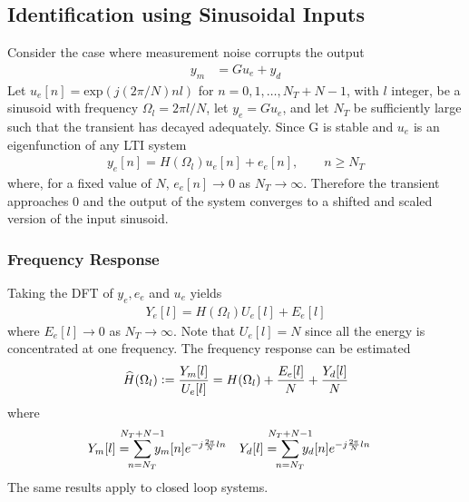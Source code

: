 \subsection{Identification using Sinusoidal Inputs}
Consider the case where measurement noise corrupts the output
\begin{align*}
	y_m &= Gu_e+y_d
\end{align*}
Let $u_e[n] = \textrm{exp}(j (2\pi / N) nl)$ for $n = 0,1,\hdots,N_T+N-1$, with $l$ integer, be a sinusoid with frequency $\Omega_l = 2\pi l/N$, let $y_e = Gu_e$, and let $N_T$ be sufficiently large such that the transient has decayed adequately. Since G is stable and $u_e$ is an eigenfunction of any LTI system
\begin{align*}
	y_e[n] = H(\Omega_l)u_e[n] + e_e[n], \qquad n\geq N_T
\end{align*}
where, for a fixed value of $N$, $e_e[n] \to 0$ as $N_T\to \infty$. Therefore the transient approaches $0$ and the output of the system converges to a shifted and scaled version of the input sinusoid.

\subsubsection{Frequency Response}
Taking the DFT of $y_e, e_e$ and $u_e$ yields
\begin{align*}
	Y_e[l] = H(\Omega_l) U_e[l] + E_e[l]
\end{align*}
where $E_e[l] \to 0$ as $N_T\to \infty$. Note that $U_e[l] = N$ since all the energy is concentrated at one frequency. The frequency response can be estimated
\begin{align*}
	\widehat{H}(\Omega_l) \vcentcolon= \frac{Y_m[l]}{U_e[l]} = H(\Omega_l) + \frac{E_e[l]}{N} + \frac{Y_d[l]}{N}
\end{align*}
where 
\begin{align*}
	Y_m[l] &= \hspace*{-1em}\sum_{n=N_T}^{N_T+N-1}\hspace*{-1em}y_m[n]e^{-j\frac{2\pi}{N}ln} & Y_d[l] &= \hspace*{-1em}\sum_{n=N_T}^{N_T+N-1}\hspace*{-1em}y_d[n]e^{-j\frac{2\pi}{N}ln}
\end{align*}
The same results apply to closed loop systems.
